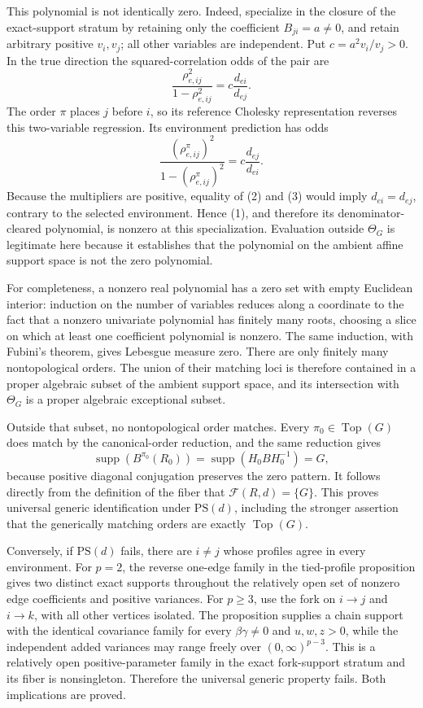 This polynomial is not identically zero.  Indeed, specialize in the closure of the exact-support stratum by retaining only the coefficient \(B_{ji}=a\ne0\), and retain arbitrary positive \(v_i,v_j\); all other variables are independent.  Put \(c=a^2v_i/v_j>0\).  In the true direction the squared-correlation odds of the pair are
\[
 \frac{\rho_{e,ij}^2}{1-\rho_{e,ij}^2}
 =c\frac{d_{ei}}{d_{ej}}. \tag{2}
\]
The order \(\pi\) places \(j\) before \(i\), so its reference Cholesky representation reverses this two-variable regression.  Its environment prediction has odds
\[
 \frac{(\rho_{e,ij}^{\pi})^2}{1-(\rho_{e,ij}^{\pi})^2}
 =c\frac{d_{ej}}{d_{ei}}. \tag{3}
\]
Because the multipliers are positive, equality of (2) and (3) would imply \(d_{ei}=d_{ej}\), contrary to the selected environment.  Hence (1), and therefore its denominator-cleared polynomial, is nonzero at this specialization.  Evaluation outside \(\Theta_G\) is legitimate here because it establishes that the polynomial on the ambient affine support space is not the zero polynomial.

For completeness, a nonzero real polynomial has a zero set with empty Euclidean interior: induction on the number of variables reduces along a coordinate to the fact that a nonzero univariate polynomial has finitely many roots, choosing a slice on which at least one coefficient polynomial is nonzero.  The same induction, with Fubini's theorem, gives Lebesgue measure zero.  There are only finitely many nontopological orders.  The union of their matching loci is therefore contained in a proper algebraic subset of the ambient support space, and its intersection with \(\Theta_G\) is a proper algebraic exceptional subset.

Outside that subset, no nontopological order matches.  Every \(\pi_0\in\operatorname{Top}(G)\) does match by the canonical-order reduction, and the same reduction gives
\[
 \operatorname{supp}(B^{\pi_0}(R_0))
 =\operatorname{supp}(H_0BH_0^{-1})=G,
\]
because positive diagonal conjugation preserves the zero pattern.  It follows directly from the definition of the fiber that \(\mathcal F(R,d)=\{G\}\).  This proves universal generic identification under \(\mathrm{PS}(d)\), including the stronger assertion that the generically matching orders are exactly \(\operatorname{Top}(G)\).

Conversely, if \(\mathrm{PS}(d)\) fails, there are \(i\ne j\) whose profiles agree in every environment.  For \(p=2\), the reverse one-edge family in the tied-profile proposition gives two distinct exact supports throughout the relatively open set of nonzero edge coefficients and positive variances.  For \(p\ge3\), use the fork on \(i\to j\) and \(i\to k\), with all other vertices isolated.  The proposition supplies a chain support with the identical covariance family for every \(\beta\gamma\ne0\) and \(u,w,z>0\), while the independent added variances may range freely over \((0,\infty)^{p-3}\).  This is a relatively open positive-parameter family in the exact fork-support stratum and its fiber is nonsingleton.  Therefore the universal generic property fails.  Both implications are proved.

